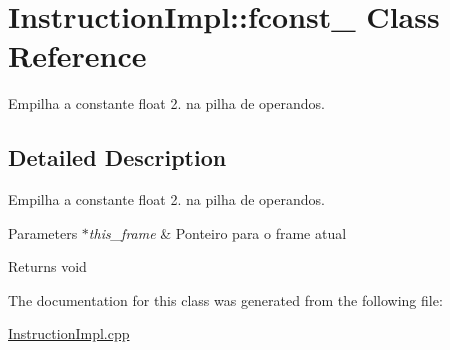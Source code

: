 \hypertarget{class_instruction_impl_1_1fconst__2}{}\section{Instruction\+Impl\+:\+:fconst\+\_ Class Reference}
\label{class_instruction_impl_1_1fconst__2}


Empilha a constante float 2. na pilha de operandos.  




\subsection{Detailed Description}
Empilha a constante float 2. na pilha de operandos. 


\begin{DoxyParams}{Parameters}
{\em $\ast$this\+\_\+frame} & Ponteiro para o frame atual \\
\hline
\end{DoxyParams}
\begin{DoxyReturn}{Returns}
void 
\end{DoxyReturn}


The documentation for this class was generated from the following file\+:\begin{DoxyCompactItemize}
\item 
\hyperlink{_instruction_impl_8cpp}{Instruction\+Impl.\+cpp}\end{DoxyCompactItemize}
